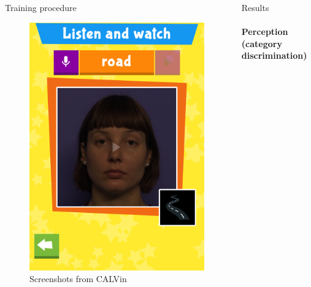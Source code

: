 \documentclass[final,xcolor={cmyk,hyperref}]{beamer}
\begin{document}
\begin{frame}[t]
\begin{columns}[t]
\begin{column}{0.45\linewidth}
\begin{block}{Training procedure}
\begin{figure}[h]
\begin{columns}
\begin{column}{\screenshotwidth}
    \includegraphics[width=\linewidth]{images/CALVin-screenshots/jpgs/watch_example}
  \end{column}
\end{columns}
\vspace*{1ex}
\caption{Screenshots from CALVin}
\end{figure}
\end{block}

\end{column}
\begin{column}{0.5\linewidth}
\begin{block}{Results}
\paragraph{Perception (category discrimination)}


\end{block}
\end{column}
\end{columns}
\end{frame}
\end{document}
